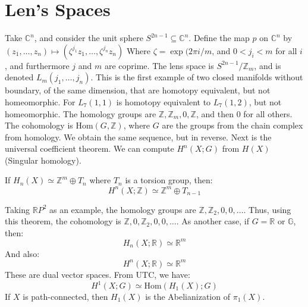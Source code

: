\section{Len's Spaces}
    Take $\mathbb{C}^{n}$, and consider the unit
    sphere $S^{2n-1}\subseteq\mathbb{C}^{n}$. Define
    the map $p$ on $\mathbb{C}^{n}$ by
    $(z_{1},\dots,z_{n})\mapsto%
     (\zeta^{j_{1}}z_{1},\dots,\zeta^{j_{n}}z_{n})$
    Where $\zeta=\exp(2\pi{i}/m$, and
    $0<j_{i}<m$ for all $i$, and furthermore
    $j$ and $m$ are coprime. The lens space is
    $S^{2n-1}/\mathbb{Z}_{m}$, and is denoted
    $L_{m}(j_{1},\dots,j_{n})$. This is the first
    example of two closed manifolds without
    boundary, of the same dimension, that are
    homotopy equivalent, but not homeomorphic.
    For $L_{7}(1,1)$ is homotopy equivalent to
    $L_{7}(1,2)$, but not homeomorphic. The
    homology groups are
    $\mathbb{Z},\mathbb{Z}_{m},0,\mathbb{Z}$, and
    then $0$ for all others. The cohomology is
    $\mathrm{Hom}(G,\mathbb{Z})$, where $G$ are
    the groups from the chain complex from homology.
    We obtain the same sequence, but in reverse.
    Next is the universal coefficient theorem. We
    can compute $H^{n}(X;G)$ from
    $H(X)$ (Singular homology).
    \begin{theorem}
        If $H_{n}(X)\simeq\mathbb{Z}^{m}\oplus{T}_{n}$
        where $T_{n}$ is a torsion group, then:
        \begin{equation}
            H^{n}(X;\mathbb{Z})\simeq
            \mathbb{Z}^{m}\oplus{T}_{n-1}
        \end{equation}
    \end{theorem}
    Taking $\mathbb{R}P^{2}$ as an example, the
    homology groups are
    $\mathbb{Z},\mathbb{Z}_{2},0,0,\dots$. Thus, using
    this theorem, the cohomology is
    $\mathbb{Z},0,\mathbb{Z}_{2},0,0,\dots$. As
    another case, if $G=\mathbb{R}$ or $\mathbb{G}$,
    then:
    \begin{equation}
        H_{n}(X;\mathbb{R})\simeq\mathbb{R}^{m}
    \end{equation}
    And also:
    \begin{equation}
        H^{n}(X;\mathbb{R})\simeq\mathbb{R}^{m}
    \end{equation}
    These are dual vector spaces. From UTC, we have:
    \begin{equation}
        H^{1}(X;G)\simeq
        \mathrm{Hom}(H_{1}(X);G)
    \end{equation}
    If $X$ is path-connected, then $H_{1}(X)$ is the
    Abelianization of $\pi_{1}(X)$.
